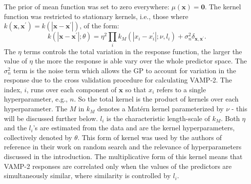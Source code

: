 The prior of mean function  was set to zero everywhere: $\mu(\mathbf{x})=\mathbf{0}$. The kernel function was restricted to stationary kernels, i.e., those where $k(\mathbf{x}, \mathbf{x}^{\prime}) = k(|\mathbf{x} - \mathbf{x}^{\prime}|)$, of the form: 
\begin{equation}\label{eqn:kernel_form}
    k\left(\left|\mathbf{x}-\mathbf{x}^{\prime}\right|; \theta\right) = 
    \eta^{2}\prod_i k_{M}\left(\left|x_{i}-x_{i}^{\prime}\right|; \nu, l_i\right)
    +\sigma_{n}^{2}\delta_{\mathbf{x}, \mathbf{x}^{\prime}}. 
\end{equation}
The $\eta$ terms controls the total variation in the response function, the larger the value of $\eta$ the more the response is able vary over the whole predictor space. The $\sigma_{n}^{2}$ term is the noise term which allows the GP to account for variation in the response due to the cross validation procedure for calculating VAMP-2.  The index, $i$, runs over each component of $\mathbf{x}$ so that $x_{i}$ refers to a single hyperparameter, e.g., $n$. So the total kernel is the product of kernels over each hyperparameter.  The $M$ in $k_{M}$ denotes a Mat\'ern kernel parameterized by $\nu$ - this will be discussed further below. $l_{i}$ is the characteristic length-scale of $k_{M}$. Both $\eta$ and the $l_{i}$'s are estimated from the data and are the kernel hyperparameters, collectively denoted by $\theta$. This form of kernel was used by the authors of reference  \cite{bergstrajamesbergstraRandomSearchHyperParameter2012} in their work on random search and the relevance of hyperparameters discussed in the introduction. The multiplicative form of this kernel means that VAMP-2 responses are correlated only when the values of the predictors are simultaneously similar, where similarity is controlled by $l_{i}$.    

